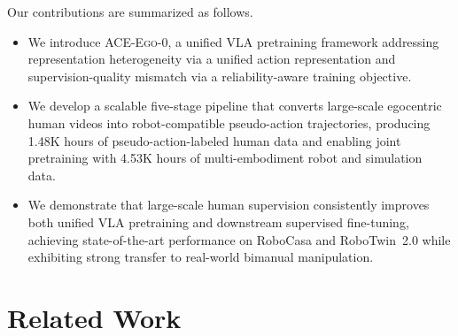 \documentclass{llmxive}
\providecommand{\OURS}{\textsc{ACE-Ego-0}\xspace}
\providecommand{\Ours}{\OURS}
\begin{document}
Our contributions are summarized as follows.
\begin{itemize}
    \item We introduce \Ours, a unified VLA pretraining framework addressing representation heterogeneity via a unified action representation and supervision-quality mismatch via a reliability-aware training objective.
    \item We develop a scalable five-stage pipeline that converts large-scale egocentric human videos into robot-compatible pseudo-action trajectories, producing 1.48K hours of pseudo-action-labeled human data and enabling joint pretraining with 4.53K hours of multi-embodiment robot and simulation data.
    \item We demonstrate that large-scale human supervision consistently improves both unified VLA pretraining and downstream supervised fine-tuning, achieving state-of-the-art performance on RoboCasa and RoboTwin~2.0 while exhibiting strong transfer to real-world bimanual manipulation.
\end{itemize}


\section{Related Work}
\end{document}
